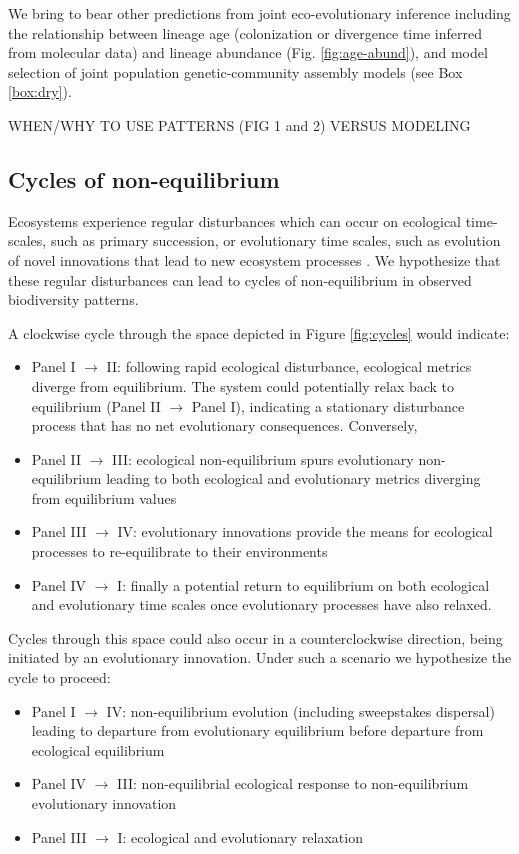 \documentclass[12pt]{article}
\newcounter{Box}
\begin{document}
We bring to bear other predictions
from joint eco-evolutionary inference including the relationship
between lineage age (colonization or divergence time inferred from
molecular data) and lineage abundance (Fig. \ref{fig:age-abund}), and
model selection of joint population genetic-community assembly models
(see Box \ref{box:dry}).

WHEN/WHY TO USE PATTERNS (FIG 1 and 2) VERSUS MODELING


\subsection{Cycles of non-equilibrium}

Ecosystems experience regular disturbances which can occur on
ecological time-scales, such as primary succession, or evolutionary
time scales, such as evolution of novel innovations that lead to new
ecosystem processes \citep{erwin2008}. We hypothesize that these
regular disturbances can lead to cycles of non-equilibrium in observed
biodiversity patterns.

A clockwise cycle through the space depicted in Figure
\ref{fig:cycles} would indicate:

\begin{itemize}
\item Panel I $\rightarrow$ II: following rapid ecological
  disturbance, ecological metrics diverge from equilibrium. The system
  could potentially relax back to equilibrium (Panel II $\rightarrow$
  Panel I), indicating a stationary disturbance process that has no
  net evolutionary consequences. Conversely,
\item Panel II $\rightarrow$ III: ecological non-equilibrium spurs
  evolutionary non-equilibrium leading to both ecological and
  evolutionary metrics diverging from equilibrium values
\item Panel III $\rightarrow$ IV: evolutionary innovations provide the
  means for ecological processes to
  re-equilibrate to their environments
\item Panel IV $\rightarrow$ I: finally a potential return to
  equilibrium on both ecological and evolutionary time scales once
  evolutionary processes have also relaxed.
\end{itemize}

Cycles through this space could also occur in a counterclockwise
direction, being initiated by an evolutionary innovation. Under such a
scenario we hypothesize the cycle to proceed:

\begin{itemize}
\item Panel I $\rightarrow$ IV: non-equilibrium evolution (including
  sweepstakes dispersal) leading to departure from evolutionary
  equilibrium before departure from ecological equilibrium
\item Panel IV $\rightarrow$ III: non-equilibrial ecological response
  to non-equilibrium evolutionary innovation
\item Panel III $\rightarrow$ I: ecological and evolutionary
  relaxation
\end{itemize}
\end{document}
